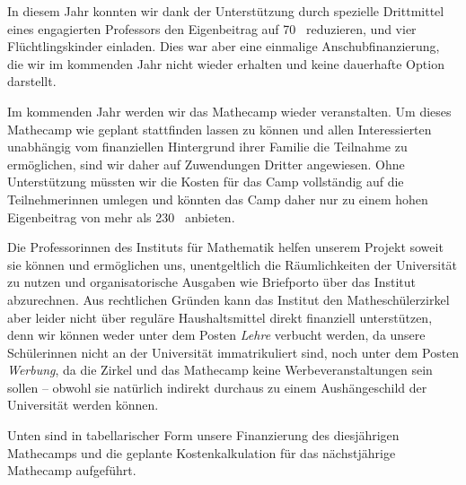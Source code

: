\documentclass[12pt]{zettel}
\newcommand{\twopics}[2]{%
  \begin{figure}[b]%
    \vspace*{0.5cm}%
    \makebox[\textwidth][c]{%
      \texttt{[image: impressionen/\#1]}%
      \hspace*{1cm}%
      \texttt{[image: impressionen/\#2]}%
    }%
    \vspace*{-1cm}%
  \end{figure}
}
\begin{document}
\twopics{klein-10}{klein-03}

In diesem Jahr konnten wir dank der Unterstützung durch
spezielle Drittmittel eines engagierten Professors den Eigenbeitrag auf
70~\texteuro{} reduzieren, und vier Flüchtlingskinder einladen. Dies war aber
eine einmalige Anschubfinanzierung, die wir im kommenden Jahr nicht wieder
erhalten und keine dauerhafte Option darstellt.

Im kommenden Jahr werden wir das Mathecamp wieder veranstalten. Um dieses Mathecamp wie geplant
stattfinden lassen zu können und allen Interessierten unabhängig vom
finanziellen Hintergrund ihrer Familie die Teilnahme zu ermöglichen, sind wir daher auf Zuwendungen
Dritter angewiesen. Ohne Unterstützung müssten wir die Kosten für das Camp vollständig auf die Teilnehmerinnen umlegen und könnten das Camp daher nur zu einem hohen Eigenbeitrag von mehr als 230~\texteuro{} anbieten.

Die Professorinnen des Instituts für Mathematik helfen unserem Projekt soweit sie können
und ermöglichen uns, unentgeltlich die Räumlichkeiten der Universität zu nutzen
und organisatorische Ausgaben wie Briefporto über das Institut abzurechnen.
Aus rechtlichen Gründen kann das Institut den Matheschülerzirkel aber leider nicht
über reguläre Haushaltsmittel direkt finanziell unterstützen, denn wir können weder unter dem Posten
\emph{Lehre} verbucht werden, da unsere Schülerinnen nicht an der Universität
immatrikuliert sind, noch unter dem Posten \emph{Werbung}, da die Zirkel und
das Mathecamp keine Werbeveranstaltungen sein sollen -- obwohl sie natürlich indirekt
durchaus zu einem Aushängeschild der Universität werden können.

Unten sind in tabellarischer Form unsere Finanzierung des diesjährigen Mathecamps und die geplante Kostenkalkulation für das nächstjährige Mathecamp aufgeführt.

\end{document}
